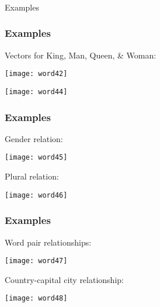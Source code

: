 

\begin{frame}[fragile]\frametitle{}

\begin{center}
{\Large Examples}
\end{center}
\end{frame}




\begin{frame}[fragile]\frametitle{Examples}
Vectors for King, Man, Queen, \& Woman:
\begin{center}
\texttt{[image: word42]}
\end{center}


\begin{center}
\texttt{[image: word44]}
\end{center}

\end{frame}

\begin{frame}[fragile]\frametitle{Examples}
Gender relation:
\begin{center}
\texttt{[image: word45]}
\end{center}
Plural relation:

\begin{center}
\texttt{[image: word46]}
\end{center}

\end{frame}


\begin{frame}[fragile]\frametitle{Examples}
Word pair relationships:
\begin{center}
\texttt{[image: word47]}
\end{center}
Country-capital city relationship:

\begin{center}
\texttt{[image: word48]}
\end{center}

\end{frame}




